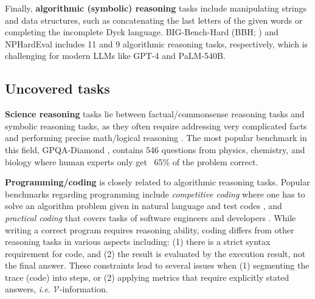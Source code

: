Finally, \textbf{algorithmic (symbolic) reasoning} tasks include manipulating strings and data structures, such as concatenating the last letters of the given words \citep{NEURIPS2022_9d560961} or completing the incomplete Dyck language. BIG-Bench-Hard (BBH; \citet{suzgun2022challengingbigbenchtaskschainofthought}) and NPHardEval \citep{fan2024nphardevaldynamicbenchmarkreasoning} includes 11 and 9 algorithmic reasoning tasks, respectively, which is challenging for modern LLMs like GPT-4 and PaLM-540B.

\subsection{Uncovered tasks}

\textbf{Science reasoning} tasks lie between factual/commonsense reasoning tasks and symbolic reasoning tasks, as they often require addressing very complicated facts and performing precise math/logical reasoning \citep{rein2024gpqa, he-etal-2024-olympiadbench}. The most popular benchmark in this field, GPQA-Diamond \citep{rein2024gpqa}, contains 546 questions from physics, chemistry, and biology where human experts only get ~65\% of the problem correct.

\textbf{Programming/coding} is closely related to algorithmic reasoning tasks. Popular benchmarks regarding programming include \textit{competitive coding} where one has to solve an algorithm problem given in natural language and test codes \citep{chen2021evaluatinglargelanguagemodels, li2022competition}, and \textit{practical coding} that covers tasks of software engineers and developers \citep{zhang-etal-2023-repocoder, jimenez2024swebenchlanguagemodelsresolve, DBLP:journals/corr/abs-2410-07095}. While writing a correct program requires reasoning ability, coding differs from other reasoning tasks in various aspects including: (1) there is a strict syntax requirement for code, and (2) the result is evaluated by the execution result, not the final answer. These constraints lead to several issues when (1) segmenting the trace (code) into steps, or (2) applying metrics that require explicitly stated answers, \textit{i.e.} $\mathcal{V}$-information.
